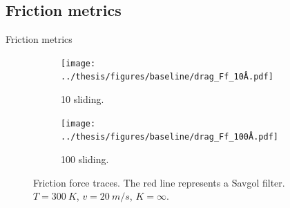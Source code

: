 \documentclass[
	10pt, %
]{beamer}
\begin{document}
\subsection{Friction metrics}
\begin{frame}{Friction metrics}
	\begin{figure}[H]
	\centering
	\begin{subfigure}[t]{0.49\textwidth}
		\centering
		\texttt{[image: ../thesis/figures/baseline/drag\_Ff\_10Å.pdf]}
		\caption{\SI{10}{} sliding.}
	\end{subfigure}
	\hfill
	\begin{subfigure}[t]{0.49\textwidth}
		\centering
		\texttt{[image: ../thesis/figures/baseline/drag\_Ff\_100Å.pdf]}
		\caption{\SI{100}{} sliding.}
	  \end{subfigure}
	   \caption{Friction force traces. The red line represents a Savgol filter. \\ $T = \SI{300}{K}$, $v = \SI{20}{m/s}$, $K = \infty$.}
  \end{figure}
\end{frame}
\end{document}
